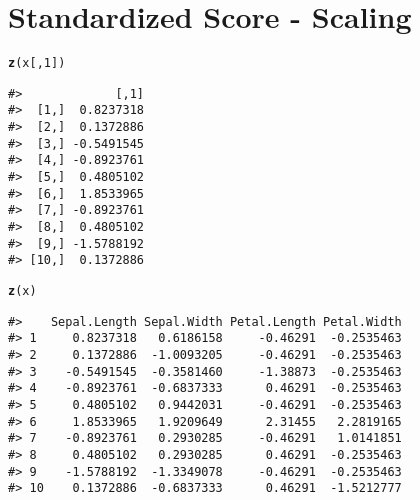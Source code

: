 \documentclass{article}\usepackage[]{graphicx}\usepackage[]{color}
\makeatletter
\newcommand{\hlnum}[1]{\textcolor[rgb]{0.686,0.059,0.569}{#1}}%
\newcommand{\hlstd}[1]{\textcolor[rgb]{0.345,0.345,0.345}{#1}}%
\newcommand{\hlkwd}[1]{\textcolor[rgb]{0.737,0.353,0.396}{\textbf{#1}}}%
\newenvironment{kframe}{%
 \def\at@end@of@kframe{}%
 \ifinner\ifhmode%
  \def\at@end@of@kframe{\end{minipage}}%
  \begin{minipage}{\columnwidth}%
 \fi\fi%
 \def\FrameCommand##1{\hskip\@totalleftmargin \hskip-\fboxsep
 \colorbox{shadecolor}{##1}\hskip-\fboxsep
     \hskip-\linewidth \hskip-\@totalleftmargin \hskip\columnwidth}%
 \MakeFramed {\advance\hsize-\width
   \@totalleftmargin\z@ \linewidth\hsize
   \@setminipage}}%
 {\par\unskip\endMakeFramed%
 \at@end@of@kframe}
\newenvironment{knitrout}{}{} %
\makeatother
\begin{document}
\section*{Standardized Score - Scaling}







\begin{knitrout}
\color{fgcolor}\begin{kframe}
\begin{alltt}
\hlkwd{z}\hlstd{(x[,} \hlnum{1}\hlstd{])}
\end{alltt}
\begin{verbatim}
#>             [,1]
#>  [1,]  0.8237318
#>  [2,]  0.1372886
#>  [3,] -0.5491545
#>  [4,] -0.8923761
#>  [5,]  0.4805102
#>  [6,]  1.8533965
#>  [7,] -0.8923761
#>  [8,]  0.4805102
#>  [9,] -1.5788192
#> [10,]  0.1372886
\end{verbatim}
\end{kframe}
\end{knitrout}







\begin{knitrout}
\color{fgcolor}\begin{kframe}
\begin{alltt}
\hlkwd{z}\hlstd{(x)}
\end{alltt}
\begin{verbatim}
#>    Sepal.Length Sepal.Width Petal.Length Petal.Width
#> 1     0.8237318   0.6186158     -0.46291  -0.2535463
#> 2     0.1372886  -1.0093205     -0.46291  -0.2535463
#> 3    -0.5491545  -0.3581460     -1.38873  -0.2535463
#> 4    -0.8923761  -0.6837333      0.46291  -0.2535463
#> 5     0.4805102   0.9442031     -0.46291  -0.2535463
#> 6     1.8533965   1.9209649      2.31455   2.2819165
#> 7    -0.8923761   0.2930285     -0.46291   1.0141851
#> 8     0.4805102   0.2930285      0.46291  -0.2535463
#> 9    -1.5788192  -1.3349078     -0.46291  -0.2535463
#> 10    0.1372886  -0.6837333      0.46291  -1.5212777
\end{verbatim}
\end{kframe}
\end{knitrout}
\end{document}
